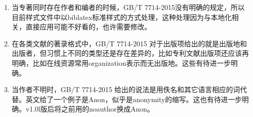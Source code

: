 \begin{enumerate}






  \item 当专著同时存在作者和编者的时候，GB/T 7714-2015没有明确的规定，所以目前样式文件中以biblatex标准样式的方式处理，这种处理因为与本地化相关，直接应用可能不好看的，也许需要修改。

  \item 在各类文献的著录格式中，GB/T 7714-2015 对于出版项给出的就是出版地和出版者，但习惯上不同的类型还是存在差异的，比如专利文献出版项还应该再明确，比如在线资源常用organization表示而无出版地。这些有待进一步明确。

  \item 当作者不明时，GB/T 7714-2015 给出的说法是用佚名和其它语言相应的词代替。英文给了一个例子是Anon，似乎是anonymity的缩写。这也有待进一步明确。v1.0l版后将之前用的noauthor换成Anon。

\end{enumerate}

